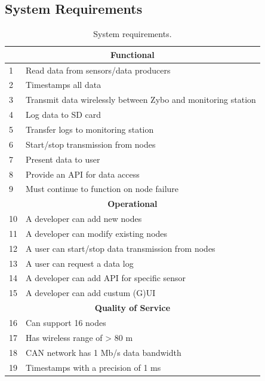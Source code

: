 \subsection{System Requirements} %
\label{sec:system_requirements}
\begin{table}[H]
\centering
\caption{System requirements.}
\label{tab:requirements}

\begin{tabular}{ |p{0.3cm}|p{10.5cm}| }
\hline
\multicolumn{2}{|c|}{\textbf{Functional}}\\
\hline
1 & Read data from sensors/data producers 				\\
2 & Timestamps all data 								\\
3 & Transmit data wirelessly between Zybo and monitoring station	\\
4 & Log data to SD card 								\\
5 & Transfer logs to monitoring station 								\\
6 & Start/stop transmission from nodes 					\\
7 & Present data to user								\\
8 & Provide an API for data access						\\
9 & Must continue to function on node failure			\\

\hline
\multicolumn{2}{|c|}{\textbf{Operational}}\\
\hline	
10 & A developer can add new nodes 										 \\
11 & A developer can modify existing nodes 								 \\
12 & A user can start/stop data transmission from nodes					 \\
13 & A user can request a data log 										 \\
14 & A developer can add API for specific sensor 						 \\
15 & A developer can add custum (G)UI									 \\


\hline
\multicolumn{2}{|c|}{\textbf{Quality of Service}}\\
\hline	
16 & Can support 16 nodes							 					\\
17 & Has wireless range of > 80 m						 				\\
18 & CAN network has 1 Mb/s data bandwidth			 					\\
19 & Timestamps with a precision of 1 ms 			 					\\


\end{tabular}
\end{table}
